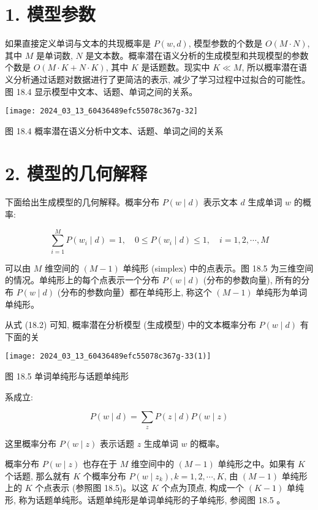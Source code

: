 \documentclass[10pt]{article}
\begin{document}
\section*{1. 模型参数}
如果直接定义单词与文本的共现概率是 $P(w, d)$, 模型参数的个数是 $O(M \cdot N)$, 其中 $M$ 是单词数, $N$ 是文本数。概率潜在语义分析的生成模型和共现模型的参数个数是 $O(M \cdot K+N \cdot K)$, 其中 $K$ 是话题数。现实中 $K \ll M$, 所以概率潜在语义分析通过话题对数据进行了更简洁的表示, 减少了学习过程中过拟合的可能性。图 18.4 显示模型中文本、话题、单词之间的关系。

\begin{center}
\texttt{[image: 2024\_03\_13\_60436489efc55078c367g-32]}
\end{center}

图 18.4 概率潜在语义分析中文本、话题、单词之间的关系

\section*{2. 模型的几何解释}
下面给出生成模型的几何解释。概率分布 $P(w \mid d)$ 表示文本 $d$ 生成单词 $w$ 的概率:

$$
\sum_{i=1}^{M} P\left(w_{i} \mid d\right)=1, \quad 0 \leqslant P\left(w_{i} \mid d\right) \leqslant 1, \quad i=1,2, \cdots, M
$$

可以由 $M$ 维空间的 $(M-1)$ 单纯形 (simplex) 中的点表示。图 18.5 为三维空间的情况。单纯形上的每个点表示一个分布 $P(w \mid d)$ (分布的参数向量), 所有的分布 $P(w \mid d)$ (分布的参数向量）都在单纯形上, 称这个 $(M-1)$ 单纯形为单词单纯形。

从式 (18.2) 可知, 概率潜在分析模型 (生成模型) 中的文本概率分布 $P(w \mid d)$ 有下面的关

\begin{center}
\texttt{[image: 2024\_03\_13\_60436489efc55078c367g-33(1)]}
\end{center}

图 18.5 单词单纯形与话题单纯形

系成立:


\begin{equation*}
P(w \mid d)=\sum_{z} P(z \mid d) P(w \mid z) \tag{18.7}
\end{equation*}


这里概率分布 $P(w \mid z)$ 表示话题 $z$ 生成单词 $w$ 的概率。

概率分布 $P(w \mid z)$ 也存在于 $M$ 维空间中的 $(M-1)$ 单纯形之中。如果有 $K$ 个话题, 那么就有 $K$ 个概率分布 $P\left(w \mid z_{k}\right), k=1,2, \cdots, K$, 由 $(M-1)$ 单纯形上的 $K$ 个点表示 (参照图 18.5)。以这 $K$ 个点为顶点, 构成一个 $(K-1)$ 单纯形, 称为话题单纯形。话题单纯形是单词单纯形的子单纯形, 参阅图 18.5 。
\end{document}
